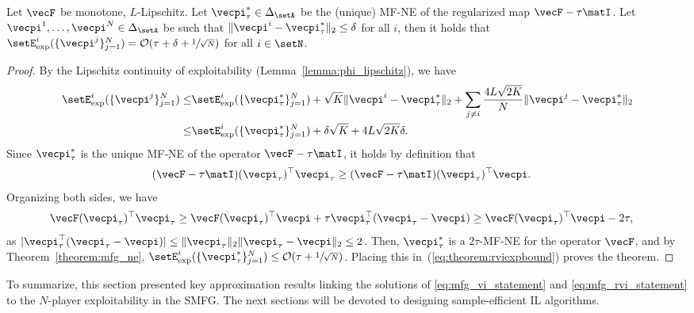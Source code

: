 \begin{theorem}
\label{theorem:mfgrvi_and_explotability}
Let $\vecF$ be monotone, $L$-Lipschitz.
Let $\vecpi_{\tau}^* \in \Delta_\setA$ be the (unique) MF-NE of the regularized map $\vecF - \tau \matI$.
Let $\vecpi^1, \ldots, \vecpi^N \in \Delta_\setA$ be such that $\|\vecpi^i - \vecpi_\tau^*\|_2 \leq \delta$ for all $i$, then it holds that $\setE^i_{\text{exp}}(\{\vecpi^j\}_{j=1}^N) = \mathcal{O}(\tau + \delta + \sfrac{1}{\sqrt{N}})$ for all $i\in\setN$.
\end{theorem}
\begin{proof}
By the Lipschitz continuity of exploitability (Lemma~\ref{lemma:phi_lipschitz}), we have
\begin{align}
    \setE^i_{\text{exp}}(\{ \vecpi^j \}_{j=1}^N) \leq &\setE^i_{\text{exp}}(\{ \vecpi_\tau^* \}_{j=1}^N) + \sqrt{K} \| \vecpi^i - \vecpi_\tau^* \|_2 + \sum_{j\neq i} \frac{4L\sqrt{2K}}{N} \| \vecpi^j - \vecpi_\tau^*\|_2 \notag \\
        \leq & \setE^i_{\text{exp}}(\{ \vecpi_\tau^* \}_{j=1}^N) + \delta \sqrt{K} + 4L\sqrt{2K} \delta. \label{eq:theorem:rviexpbound}
\end{align}
Since $\vecpi_\tau^*$ is the unique MF-NE of the operator $\vecF - \tau \matI$, it holds by definition that
\begin{align*}
    (\vecF - \tau \matI)(\vecpi_{\tau})^\top \vecpi_{\tau} &\geq (\vecF - \tau \matI)(\vecpi_{\tau})^\top \vecpi.
\end{align*}
Organizing both sides, we have
\begin{align*}
    \vecF(\vecpi_{\tau})^\top\vecpi_{\tau} &\geq \vecF(\vecpi_{\tau})^\top \vecpi + \tau \vecpi_{\tau}^\top (\vecpi_{\tau} - \vecpi) \geq \vecF(\vecpi_{\tau})^\top \vecpi - 2\tau,
\end{align*}
as $|\vecpi_{\tau}^\top (\vecpi_{\tau} - \vecpi)| \leq \|\vecpi_{\tau}\|_2 \|\vecpi_{\tau} - \vecpi\|_2 \leq 2$.
Then, $\vecpi^*_{\tau}$ is a $2\tau$-MF-NE for the operator $\vecF$, and by Theorem~\ref{theorem:mfg_ne}, $\setE^i_{\text{exp}}(\{ \vecpi_\tau^* \}_{j=1}^N) \leq \mathcal{O}(\tau + \sfrac{1}{\sqrt{N}})$.
Placing this in~(\ref{eq:theorem:rviexpbound}) proves the theorem.
\end{proof}






To summarize, this section presented key approximation results linking the solutions of \eqref{eq:mfg_vi_statement} and \eqref{eq:mfg_rvi_statement} to the $N$-player exploitability in the SMFG.
The next sections will be devoted to designing sample-efficient IL algorithms.

